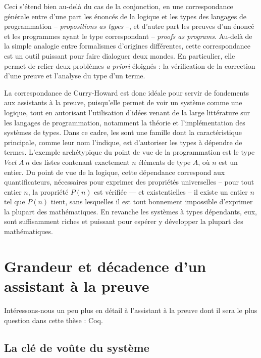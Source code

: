 Ceci s’étend bien au-delà du cas de la conjonction,
en une correspondance générale entre d’une part les énoncés de la logique et les types des langages de programmation – \emph{propositions as types} –, et d’autre part les preuves d’un énoncé et les programmes ayant le type correspondant – \emph{proofs as programs}.
Au-delà de la simple analogie entre formalismes d’origines différentes, cette correspondance est un outil puissant pour faire dialoguer deux mondes.
En particulier, elle permet de relier deux problèmes \textit{a priori} éloignés :
la vérification de la correction d’une preuve et l’analyse du type d’un terme.

La correspondance de Curry-Howard est donc idéale pour servir de fondements aux
assistants à la preuve, puisqu’elle permet de voir un système
comme une logique, tout en autorisant l’utilisation d’idées venant de
la large littérature sur les langages de programmation, notamment
la théorie et l’implémentation des systèmes de types.
Dans ce cadre, les  sont une famille dont
la caractéristique principale, comme leur nom l’indique, est d’autoriser les
types à dépendre de termes. L’exemple archétypique du point de vue de la 
programmation est le type
$Vect~A~n$ des listes contenant exactement $n$ éléments
de type $A$, où $n$ est un entier.
Du point de vue de la logique, cette
dépendance correspond aux quantificateurs, nécessaires pour exprimer des
propriétés universelles – pour tout entier $n$, la propriété $P(n)$ est
vérifiée — et existentielles – il existe un entier $n$ tel que $P(n)$ tient,
sans lesquelles il est tout bonnement impossible d’exprimer la plupart des
mathématiques. En revanche les systèmes à types dépendants, eux, sont suffisamment
riches et puissant pour espérer y développer la plupart des mathématiques.

\section{Grandeur et décadence d’un assistant à la preuve}
\label{sec-coq}

  Intéressons-nous un peu plus en détail à l’assistant à la
  preuve dont il sera le plus question dans cette thèse : Coq.

  \subsection{La clé de voûte du système}
  
